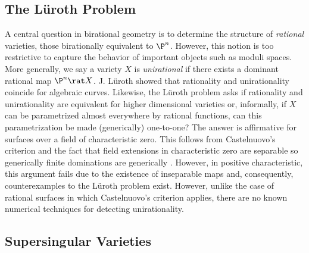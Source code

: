 \documentclass[11pt]{amsart}
\begin{document}
\thispagestyle{empty}

\subsection*{The L\"{u}roth Problem}

A central question in birational geometry is to determine the structure of \textit{rational} varieties, those birationally equivalent to $\P^n$. However, this notion is too restrictive to capture the behavior of important objects such as moduli spaces. More generally, we say a variety $X$ is \textit{unirational} if there exists a dominant rational map $\P^n \rat X$. J. L\"{u}roth showed \cite{Luroth} that rationality and unirationality coincide for algebraic curves. Likewise, the L\"{u}roth problem asks if rationality and unirationality are equivalent for higher dimensional varieties or, informally, if $X$ can be parametrized almost everywhere by rational functions, can this parametrization be made (generically) one-to-one? 
The answer is affirmative for surfaces over a field of characteristic zero. This follows from Castelnuovo's criterion and the fact that field extensions in characteristic zero are separable so generically finite dominations are generically \etale. However, in positive characteristic, this argument fails due to the existence of inseparable maps and, consequently, counterexamples to the L\"{u}roth problem exist. However, unlike the case of rational surfaces in which Castelnuovo's criterion applies, there are no known numerical techniques for detecting unirationality.

\subsection*{Supersingular Varieties}
\end{document}
